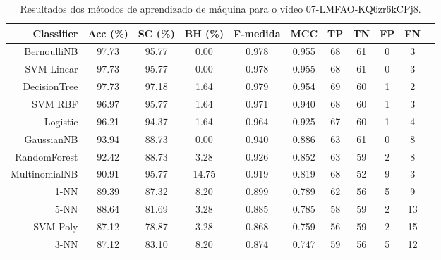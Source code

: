 \begin{table}[!htb]
\centering
\caption{Resultados dos métodos de aprendizado de máquina para o vídeo 07-LMFAO-KQ6zr6kCPj8.}
\label{tab:07-LMFAO-KQ6zr6kCPj8}
\begin{tabular}{r|c|c|c|c|c|c|c|c|c|c}
\hline\hline
Classifier & Acc (\%) & SC (\%) & BH (\%) & F-medida & MCC & TP & TN & FP & FN \\ \hline
BernoulliNB & 97.73 & 95.77 & 0.00 & 0.978 & 0.955 & 68 & 61 & 0 & 3 \\ 
SVM Linear & 97.73 & 95.77 & 0.00 & 0.978 & 0.955 & 68 & 61 & 0 & 3 \\ 
DecisionTree & 97.73 & 97.18 & 1.64 & 0.979 & 0.954 & 69 & 60 & 1 & 2 \\ 
SVM RBF & 96.97 & 95.77 & 1.64 & 0.971 & 0.940 & 68 & 60 & 1 & 3 \\ 
Logistic & 96.21 & 94.37 & 1.64 & 0.964 & 0.925 & 67 & 60 & 1 & 4 \\ 
GaussianNB & 93.94 & 88.73 & 0.00 & 0.940 & 0.886 & 63 & 61 & 0 & 8 \\ 
RandomForest & 92.42 & 88.73 & 3.28 & 0.926 & 0.852 & 63 & 59 & 2 & 8 \\ 
MultinomialNB & 90.91 & 95.77 & 14.75 & 0.919 & 0.819 & 68 & 52 & 9 & 3 \\ 
1-NN & 89.39 & 87.32 & 8.20 & 0.899 & 0.789 & 62 & 56 & 5 & 9 \\ 
5-NN & 88.64 & 81.69 & 3.28 & 0.885 & 0.785 & 58 & 59 & 2 & 13 \\ 
SVM Poly & 87.12 & 78.87 & 3.28 & 0.868 & 0.759 & 56 & 59 & 2 & 15 \\ 
3-NN & 87.12 & 83.10 & 8.20 & 0.874 & 0.747 & 59 & 56 & 5 & 12 \\ 
\hline\hline
\end{tabular}
\end{table}
